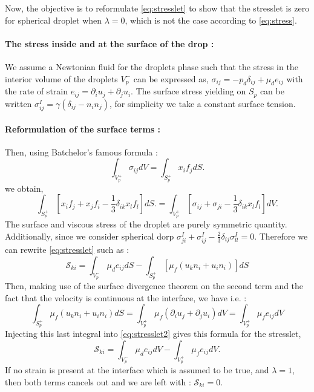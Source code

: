 \documentclass[12pt]{My_preprint}
\renewcommand{\ref}[1]{\autoref{#1}}
\begin{document}
Now, the objective is to reformulate \ref{eq:stresslet} to show that the stresslet is zero for spherical droplet when $\lambda=0$, which is not the case according to \ref{eq:stress}.



\paragraph*{The stress inside and at the surface of the drop :}

We assume a Newtonian fluid for the droplets phase such that the stress in the interior volume of the droplets $V^-_p$ can be expressed as, $\sigma_{ij} = - p_d \delta_{ij} + \mu_d e_{ij}$ with the rate of strain $e_{ij} = \partial_i u_j + \partial_j u_i$. 
The surface stress yielding on $S_p$ can be written $\sigma^I_{ij} = \gamma (\delta_{ij} - n_in_j)$, for simplicity we take a constant surface tension. 


\paragraph*{Reformulation of the surface terms :}
Then, using Batchelor’s famous formula :
\begin{equation*}
    \int_{V^+_p} \sigma_{ij} dV 
    = \int_{S^+_p} x_i f_j dS.
    \label{eq:bachelor}
\end{equation*}
 we obtain, 
\begin{equation}
    \int_{S^+_p} \left[
        x_i f_j+ x_j f_i - \frac{1}{3}\delta_{ik}x_lf_l
    \right]  dS.
    = \int_{V^+_p} \left[
        \sigma_{ij} 
        + \sigma_{ji} 
        - \frac{1}{3}\delta_{ik}x_lf_l
        \right]
    dV.
\end{equation}
The surface and viscous stress of the droplet are purely symmetric quantity.
Additionally, since we consider spherical dorp $\sigma^I_{ji} + \sigma^I_{ij} -\frac{2}{3}\delta_{ij}\sigma_{ll}^I = 0$.
Therefore we can rewrite \ref{eq:stresslet} such as :
\begin{equation}
    \label{eq:stresslet2}
    \mathscr{S}_{ki}
    = 
    \int_{V_p^-}
        \mu_d e_{ij} 
    dS
    - \int_{S_p^+}
    \left[
         \mu_f (u_k n_i+u_i n_i)
    \right]
    dS
\end{equation}
Then, making use of the surface divergence theorem on the second term and the fact that the velocity is continuous at the interface, we have i.e. :
\begin{equation*}
    \int_{S_p^+}
        \mu_f (u_k n_i+u_i n_i)
    dS
    = 
    \int_{V_p^+}
        \mu_f (\partial_i u_j + \partial_j u_i)
    dV
    = 
    \int_{V_p^+}
        \mu_f e_{ij}
    dV
\end{equation*}
Injecting this last integral into \ref{eq:stresslet2} gives this formula for the stresslet, 
\begin{equation}
    \mathscr{S}_{ki}
    = 
    \int_{V_p^-}
        \mu_d e_{ij} 
    dV
    - \int_{V_p^+}
    \mu_f e_{ij}
    dV.
    \label{eq:final_stress}
\end{equation}
If no strain is present at the interface which is assumed to be true, and $\lambda =1$, then both terms cancels out and we are left with :  
$\mathscr{S}_{ki}
= 0$. 
\end{document}
